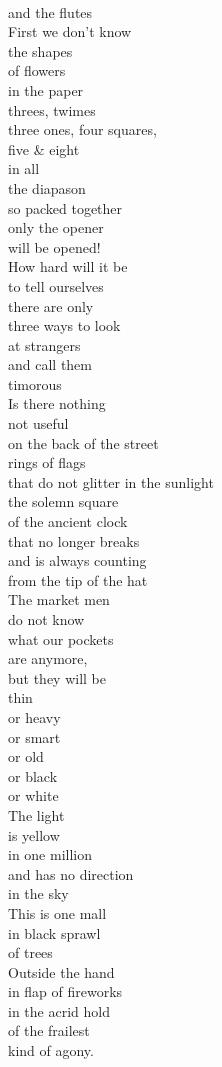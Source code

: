 \documentclass[smalldemyvopaper,11pt,twoside,onecolumn,openright,extrafontsizes]{memoir}
\begin{document}
\\and the flutes
\\First we don't know
\\the shapes
\\of flowers
\\in the paper
\\threes, twimes
\\three ones, four squares,
\\five \& eight
\\in all
\\the diapason
\\so packed together
\\only the opener
\\will be opened!
\\How hard will it be
\\to tell ourselves
\\there are only
\\three ways to look
\\at strangers
\\and call them
\\timorous
\\Is there nothing
\\not useful
\\on the back of the street
\\rings of flags
\\that do not glitter in the sunlight
\\the solemn square
\\of the ancient clock
\\that no longer breaks
\\and is always counting
\\from the tip of the hat
\\The market men
\\do not know
\\what our pockets
\\are anymore,
\\but they will be
\\thin
\\or heavy
\\or smart
\\or old
\\or black
\\or white
\\The light
\\is yellow
\\in one million
\\and has no direction
\\in the sky
\\This is one mall
\\in black sprawl
\\of trees
\\Outside the hand
\\in flap of fireworks
\\in the acrid hold
\\of the frailest
\\kind of agony.
\end{document}
